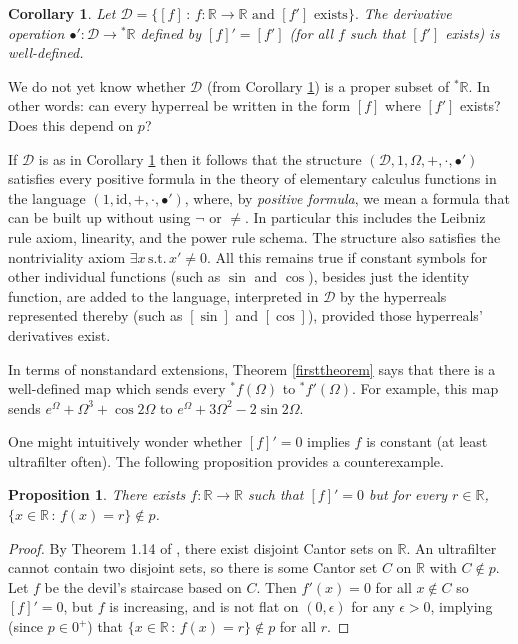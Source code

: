 \documentclass[microtype]{jloganal}
\newtheorem{proposition}[theorem]{Proposition}
\newtheorem{corollary}[theorem]{Corollary}
\begin{document}
\begin{corollary}
\label{primewelldefdcorollary}
    Let
    $
        \mathcal D
        =
        \{
            [f] \,:\, \mbox{$f:\mathbb R\to\mathbb R$ and $[f']$ exists}
        \}.
    $
    The derivative operation $\bullet':\mathcal D\to {}^*\mathbb R$
    defined by $[f]'=[f']$ (for all $f$ such that $[f']$ exists) is well-defined.
\end{corollary}

We do not yet know whether $\mathcal D$ (from
Corollary \ref{primewelldefdcorollary}) is a proper subset of ${}^*\mathbb R$.
In other words: can every hyperreal be written in the form $[f]$ where $[f']$
exists? Does this depend on $p$?

If $\mathcal D$ is as in Corollary \ref{primewelldefdcorollary} then
it follows that the structure $(\mathcal D,1,\Omega,+,\cdot,\bullet')$ satisfies
every positive formula in the theory of elementary calculus functions
in the language $(1,\mathrm{id},+,\cdot,\bullet')$, where,
by \emph{positive formula},
we mean a formula that can be built up without using $\neg$ or $\not=$.
In particular this includes the Leibniz rule axiom, linearity,
and the power rule schema.
The structure also satisfies the nontriviality axiom
$\exists x\,\mbox{s.t.}\,x'\not=0$.
All this remains true if constant symbols for other individual functions
(such as $\sin$ and $\cos$), besides just the identity function,
are added to the language, interpreted in $\mathcal D$ by
the hyperreals represented thereby (such as $[\sin]$ and $[\cos]$), provided
those hyperreals' derivatives exist.

In terms of nonstandard extensions, Theorem \ref{firsttheorem}
says that there is a well-defined map which sends
every ${}^*f(\Omega)$ to ${}^*f'(\Omega)$.
For example, this map sends $e^\Omega+\Omega^3+\cos2\Omega$
to $e^\Omega+3\Omega^2-2\sin2\Omega$.

One might intuitively wonder whether $[f]'=0$ implies $f$ is constant
(at least ultrafilter often). The following proposition provides a counterexample.

\begin{proposition}
    There exists $f:\mathbb R\to\mathbb R$ such that $[f]'=0$
    but for every $r\in\mathbb R$, $\{x\in\mathbb R\,:\,f(x)=r\}\not\in p$.
\end{proposition}

\begin{proof}
    By Theorem 1.14 of \cite{bankston1979topological},
    there exist disjoint Cantor sets on $\mathbb R$.
    An ultrafilter cannot contain two disjoint sets, so
    there is some Cantor set $C$ on $\mathbb R$ with $C\not\in p$.
    Let $f$ be the devil's staircase based on $C$.
    Then $f'(x)=0$ for all $x\not\in C$ so $[f]'=0$,
    but $f$ is increasing, and is not flat on $(0,\epsilon)$ for
    any $\epsilon>0$, implying (since $p\in0^+$)
    that $\{x\in\mathbb R\,:\,f(x)=r\}\not\in p$ for all $r$.
\end{proof}
\end{document}
